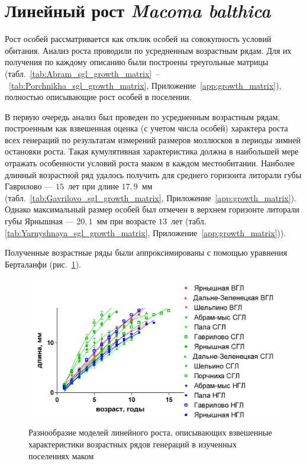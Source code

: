     \section{Линейный рост {\it Macoma balthica}}
Рост особей рассматривается как отклик особей на совокупность условий обитания. 
Анализ роста проводили по усредненным возрастным рядам. 
Для их получения по каждому описанию   были   построены   треугольные   матрицы   (табл.~\ref{tab:Abram_sgl_growth_matrix}~--~\ref{tab:Porchnikha_sgl_growth_matrix},   Приложение~\ref{app:growth_matrix}),   полностью описывающие рост особей в поселении.

В   первую   очередь   анализ   был   проведен   по  усредненным   возрастным   рядам, построенным как взвешенная оценка (с учетом числа особей) характера роста всех генераций по   результатам   измерений   размеров  моллюсков  в   периоды   зимней   остановки   роста.  
Такая кумулятивная   характеристика   должна   в   наибольшей   мере   отражать   особенности   условий роста маком в каждом местообитании.
Наиболее длинный возрастной ряд удалось получить для среднего горизонта литорали губы Гаврилово --- $15$~лет при длине $17,9$~мм (табл.~\ref{tab:Gavrilovo_sgl_growth_matrix},   Приложение~\ref{app:growth_matrix}). 
Однако максимальный размер особей был отмечен в верхнем горизонте литорали губы Ярнышная --- $20,1$~мм при возрасте $13$~лет (табл. \ref{tab:Yarnyshnaya_sgl_growth_matrix},   Приложение~\ref{app:growth_matrix})). 

Полученные   возрастные   ряды   были   аппроксимированы   с   помощью   уравнения Берталанфи   (рис.~\ref{ris:Barents_growth_gorizonts_all}).
    \begin{figure}[hbp]
        \includegraphics[width=\textwidth]{../Barenc_Sea/growth_from_MSc/Rost_gorizonts_all.jpg}
    \caption{Разнообразие моделей линейного роста, описывающих взвешенные характеристики возрастных рядов генераций в изученных поселениях маком}
    \label{ris:Barents_growth_gorizonts_all}
    \end{figure}

